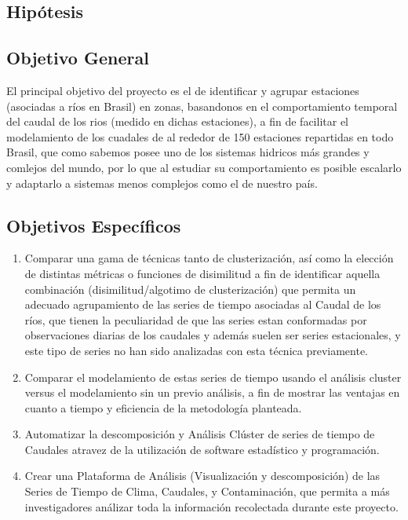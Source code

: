 \documentclass[10pt,a4paper]{article}
\begin{document}
\subsection{Hipótesis}


\subsection{Objetivo General}
El principal objetivo del proyecto es el de identificar y agrupar estaciones (asociadas a ríos en Brasil) en zonas, basandonos en el comportamiento temporal del caudal de los rios (medido en dichas estaciones), a fin de facilitar el modelamiento de los cuadales de al rededor de 150 estaciones repartidas en todo Brasil, que como sabemos posee uno de los sistemas hidricos más grandes y comlejos del mundo, por lo que al estudiar su comportamiento es posible escalarlo y adaptarlo a sistemas menos complejos como el de nuestro país.

\subsection{Objetivos Específicos}
\begin{enumerate}

\item Comparar una gama de técnicas tanto de clusterización, así como la elección de distintas métricas o funciones de disimilitud a fin de identificar aquella combinación (disimilitud/algotimo de clusterización) que permita un adecuado agrupamiento de las series de tiempo asociadas al Caudal de los ríos, que tienen la peculiaridad de que las series estan conformadas por observaciones diarias de los caudales y además suelen ser series estacionales, y este tipo de series no han sido analizadas con esta técnica previamente.

\item Comparar el modelamiento de estas series de tiempo usando el análisis cluster versus el modelamiento sin un previo análisis, a fin de mostrar las ventajas en cuanto a tiempo y eficiencia de la metodología planteada.

\item Automatizar la descomposición y Análisis Clúster de series de tiempo de Caudales atravez de la utilización de software estadístico y programación.

\item Crear una Plataforma de Análisis (Visualización y descomposición) de las Series de Tiempo de Clima, Caudales, y Contaminación, que permita a más investigadores análizar toda la información recolectada durante este proyecto.

\end{enumerate}
\end{document}
